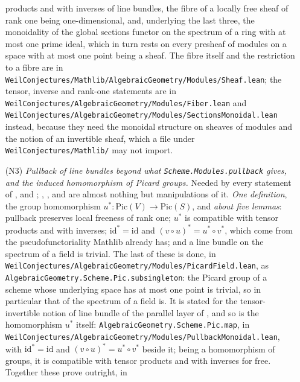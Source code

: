 \begin{enumerate}
  products and with inverses of line bundles, the fibre of a locally free
  sheaf of rank one being one-dimensional, and, underlying the last three, the
  monoidality of the global sections functor on the spectrum of a ring with at
  most one prime ideal, which in turn rests on every presheaf of modules on a
  space with at most one point being a sheaf.  The fibre itself and the
  restriction to a fibre are in
  \texttt{WeilConjectures/Mathlib/AlgebraicGeometry/Modules/Sheaf.lean}; the
  tensor, inverse and rank-one statements are in
  \texttt{WeilConjectures/AlgebraicGeometry/Modules/Fiber.lean} and
  \texttt{WeilConjectures/AlgebraicGeometry/Modules/SectionsMonoidal.lean}
  instead, because they need the monoidal structure on sheaves of modules and
  the notion of an invertible sheaf, which a file under
  \texttt{WeilConjectures/Mathlib/} may not import.
  \item[(N3)] \emph{Pullback of line bundles beyond what
  \texttt{Scheme.Modules.pullback} gives, and the induced homomorphism of
  Picard groups.}  Needed by every statement of
  ,  and ;
  , ,
   and  are
  almost nothing but manipulations of it.  \emph{One definition}, the group
  homomorphism $u^*\colon\mathrm{Pic}(V)\to\mathrm{Pic}(S)$, and \emph{about
  five lemmas}: pullback preserves local freeness of rank one; $u^*$ is
  compatible with tensor products and with inverses;
  $\mathrm{id}^*=\mathrm{id}$ and $(v\circ u)^*=u^*\circ v^*$, which come from
  the pseudofunctoriality Mathlib already has; and a line bundle on the
  spectrum of a field is trivial.  The last of these is done, in
  \texttt{WeilConjectures/AlgebraicGeometry/Modules/PicardField.lean}, as
  \texttt{AlgebraicGeometry.Scheme.Pic.subsingleton}: the Picard group of a
  scheme whose underlying space has at most one point is trivial, so in
  particular that of the spectrum of a field is.  It is stated for the
  tensor-invertible notion of line bundle of the parallel layer of
  , and so is the homomorphism $u^*$ itself:
  \texttt{AlgebraicGeometry.Scheme.Pic.map}, in
  \texttt{WeilConjectures/AlgebraicGeometry/Modules/PullbackMonoidal.lean},
  with $\mathrm{id}^*=\mathrm{id}$ and $(v\circ u)^*=u^*\circ v^*$ beside it;
  being a homomorphism of groups, it is compatible with tensor products and
  with inverses for free.  Together these prove
   outright, in

\end{enumerate}
